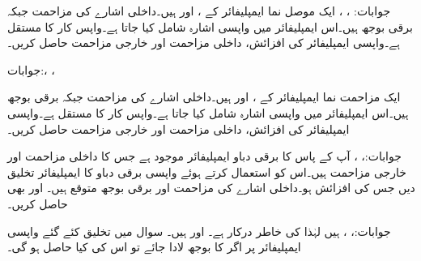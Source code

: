 جوابات: ، ، 
ایک موصل نما ایمپلیفائر کے ،  اور
  ہیں۔داخلی اشارے کی مزاحمت  جبکہ برقی بوجھ  ہیں۔اس ایمپلیفائر میں واپسی اشارہ شامل کیا جاتا ہے۔واپس کار کا مستقل  ہے۔واپسی ایمپلیفائر کی افزائش، داخلی مزاحمت اور خارجی مزاحمت حاصل کریں۔

جوابات:، ، 

ایک مزاحمت نما ایمپلیفائر کے ،  اور
  ہیں۔داخلی اشارے کی مزاحمت  جبکہ برقی بوجھ  ہیں۔اس ایمپلیفائر میں واپسی اشارہ شامل کیا جاتا ہے۔واپس کار کا مستقل  ہے۔واپسی ایمپلیفائر کی افزائش، داخلی مزاحمت اور خارجی مزاحمت حاصل کریں۔

جوابات:، ، 
آپ کے پاس  کا برقی دباو ایمپلیفائر موجود ہے جس کا داخلی مزاحمت  اور خارجی مزاحمت  ہیں۔اس کو استعمال کرتے ہوئے واپسی برقی دباو کا ایمپلیفائر تخلیق دیں جس کی افزائش  ہو۔داخلی اشارے کی مزاحمت  اور برقی بوجھ  متوقع ہیں۔ اور  بھی حاصل کریں۔

جوابات:، ،  ہیں لہٰذا  کی خاطر  درکار ہے۔ اور  ہیں۔
سوال  میں تخلیق کئے گئے واپسی ایمپلیفائر پر اگر  کا بوجھ لادا جائے تو اس کی  کیا حاصل ہو گی۔

